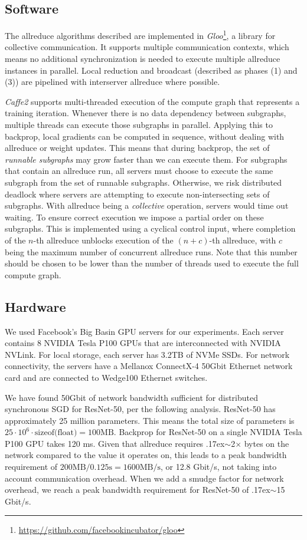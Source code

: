 \documentclass[10pt,twocolumn,letterpaper]{article}
\def\x{\times}
\newcommand{\app}{\raise.17ex\hbox{$\scriptstyle\sim$}}
\begin{document}
\subsection{Software}

The allreduce algorithms described are implemented in \emph{Gloo}\footnote{\url{https://github.com/facebookincubator/gloo}}, a library for collective communication. It supports multiple communication contexts, which means no additional synchronization is needed to execute multiple allreduce instances in parallel. Local reduction and broadcast (described as phases (1) and (3)) are pipelined with interserver allreduce where possible.

\emph{Caffe2} supports multi-threaded execution of the compute graph that represents a training iteration. Whenever there is no data dependency between subgraphs, multiple threads can execute those subgraphs in parallel. Applying this to backprop, local gradients can be computed in sequence, without dealing with allreduce or weight updates. This means that during backprop, the set of \emph{runnable subgraphs} may grow faster than we can execute them. For subgraphs that contain an allreduce run, all servers must choose to execute the same subgraph from the set of runnable subgraphs. Otherwise, we risk distributed deadlock where servers are attempting to execute non-intersecting sets of subgraphs. With allreduce being a \emph{collective} operation, servers would time out waiting. To ensure correct execution we impose a partial order on these subgraphs. This is implemented using a cyclical control input, where completion of the $n$-th allreduce unblocks execution of the $(n+c)$-th allreduce, with $c$ being the maximum number of concurrent allreduce runs. Note that this number should be chosen to be lower than the number of threads used to execute the full compute graph.

\subsection{Hardware}

We used Facebook's Big Basin \cite{Lee2017} GPU servers for our experiments. Each server contains 8 NVIDIA Tesla P100 GPUs that are interconnected with NVIDIA NVLink. For local storage, each server has 3.2TB of NVMe SSDs. For network connectivity, the servers have a Mellanox ConnectX-4 50Gbit Ethernet network card and are connected to Wedge100 \cite{Bagga2016} Ethernet switches.

We have found 50Gbit of network bandwidth sufficient for distributed synchronous SGD for ResNet-50, per the following analysis. ResNet-50 has approximately 25 million parameters. This means the total size of parameters is $25 \cdot 10^6 \cdot \text{sizeof(float)}=100\text{MB}$. Backprop for ResNet-50 on a single NVIDIA Tesla P100 GPU takes 120 ms. Given that allreduce requires \app2$\x$ bytes on the network compared to the value it operates on, this leads to a peak bandwidth requirement of $200\text{MB}/0.125\text{s}=1600\text{MB/s}$, or 12.8 Gbit/s, not taking into account communication overhead. When we add a smudge factor for network overhead, we reach a peak bandwidth requirement for ResNet-50 of \app15 Gbit/s.
\end{document}
